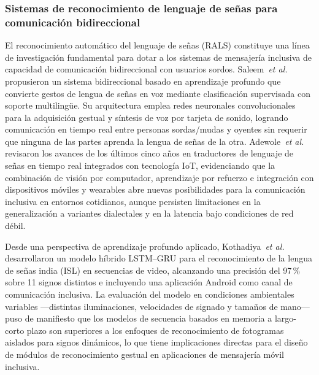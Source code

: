 \documentclass[journal]{IEEEtran}
\begin{document}
	\subsubsection{Sistemas de reconocimiento de lenguaje de se\~nas para comunicaci\'on bidireccional}
	El reconocimiento autom\'atico del lenguaje de se\~nas (RALS) constituye una l\'inea de investigaci\'on fundamental para dotar a los sistemas de mensajer\'ia inclusiva de capacidad de comunicaci\'on bidireccional con usuarios sordos. Saleem~\textit{et al.} \cite{saleem2023} propusieron un sistema bidireccional basado en aprendizaje profundo que convierte gestos de lengua de se\~nas en voz mediante clasificaci\'on supervisada con soporte multiling\"ue. Su arquitectura emplea redes neuronales convolucionales para la adquisici\'on gestual y s\'intesis de voz por tarjeta de sonido, logrando comunicaci\'on en tiempo real entre personas sordas/mudas y oyentes sin requerir que ninguna de las partes aprenda la lengua de se\~nas de la otra. Adewole~\textit{et al.} \cite{papatsimouli2023} revisaron los avances de los \'ultimos cinco a\~nos en traductores de lenguaje de se\~nas en tiempo real integrados con tecnolog\'ia IoT, evidenciando que la combinaci\'on de visi\'on por computador, aprendizaje por refuerzo e integraci\'on con dispositivos m\'oviles y wearables abre nuevas posibilidades para la comunicaci\'on inclusiva en entornos cotidianos, aunque persisten limitaciones en la generalizaci\'on a variantes dialectales y en la latencia bajo condiciones de red d\'ebil.
	
	Desde una perspectiva de aprendizaje profundo aplicado, Kothadiya~\textit{et al.} \cite{kothadiya2022} desarrollaron un modelo h\'ibrido LSTM--GRU para el reconocimiento de la lengua de se\~nas india (ISL) en secuencias de video, alcanzando una precisi\'on del 97\,\% sobre 11 signos distintos e incluyendo una aplicaci\'on Android como canal de comunicaci\'on inclusiva. La evaluaci\'on del modelo en condiciones ambientales variables ---distintas iluminaciones, velocidades de signado y tama\~nos de mano--- puso de manifiesto que los modelos de secuencia basados en memoria a largo-corto plazo son superiores a los enfoques de reconocimiento de fotogramas aislados para signos din\'amicos, lo que tiene implicaciones directas para el dise\~no de m\'odulos de reconocimiento gestual en aplicaciones de mensajer\'ia m\'ovil inclusiva.
	
\end{document}
